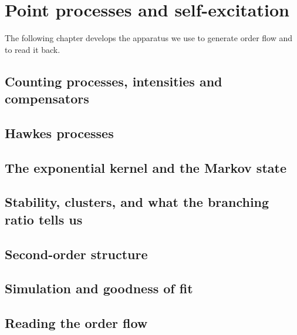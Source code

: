 \chapter{Point processes and self-excitation}
\label{chap.hawkes}

The following chapter develops the apparatus we use to generate order flow and
to read it back.

\section{Counting processes, intensities and compensators}
\label{sec.countingProcesses}


\section{Hawkes processes}
\label{sec.hawkesProcesses}


\section{The exponential kernel and the Markov state}
\label{sec.exponentialKernel}


\section{Stability, clusters, and what the branching ratio tells us}
\label{sec.stability}


\section{Second-order structure}
\label{sec.secondOrder}


\section{Simulation and goodness of fit}
\label{sec.simulation}


\section{Reading the order flow}
\label{sec.readingOrderFlow}


